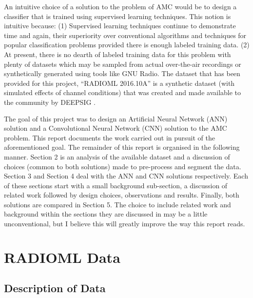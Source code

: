 \documentclass[journal,onecolumn]{IEEEtran}
\begin{document}
An intuitive choice of a solution to the problem of AMC would be to design a classifier that is trained using supervised learning techniques. This notion is intuitive because:
(1)	Supervised learning techniques continue to demonstrate time and again, their superiority over conventional algorithms and techniques for popular classification problems provided there is enough labeled training data. 
(2)	At present, there is no dearth of labeled training data for this problem with plenty of datasets which may be sampled from actual over-the-air recordings or synthetically generated using tools like GNU Radio. The dataset that has been provided for this project, “RADIOML 2016.10A” is a synthetic dataset (with simulated effects of channel conditions) that was created and made available to the community by DEEPSIG \cite{rmlDset}.

The goal of this project was to design an Artificial Neural Network (ANN) solution and a Convolutional Neural Network (CNN) solution to the AMC problem. This report documents the work carried out in pursuit of the aforementioned goal.  The remainder of this report is organised in the following manner. Section 2 is an analysis of the available dataset and a discussion of choices (common to both solutions) made to pre-process and segment the data. Section 3 and Section 4 deal with the ANN and CNN solutions respectively. Each of these sections start with a small background sub-section, a discussion of related work followed by design choices, observations and results. Finally, both solutions are compared in Section 5. The choice to include related work and background within the sections they are discussed in may be a little unconventional, but I believe this will greatly improve the way this report reads.


 

\section{RADIOML Data}

\subsection{Description of Data}
\end{document}
